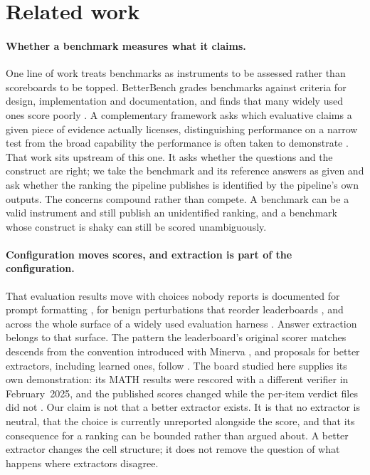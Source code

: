 
\section{Related work}
\label{sec:related}

\paragraph{Whether a benchmark measures what it claims.}
One line of work treats benchmarks as instruments to be assessed rather than scoreboards to be
topped. BetterBench grades benchmarks against criteria for design, implementation and
documentation, and finds that many widely used ones score poorly \citep{reuel2024betterbench}.
A complementary framework asks which evaluative claims a given piece of evidence actually
licenses, distinguishing performance on a narrow test from the broad capability the
performance is often taken to demonstrate \citep{salaudeen2025measurement}. That work sits
upstream of this one. It asks whether the questions and the construct are right; we take the
benchmark and its reference answers as given and ask whether the ranking the pipeline
publishes is identified by the pipeline's own outputs. The concerns compound rather than
compete. A benchmark can be a valid instrument and still publish an unidentified ranking, and
a benchmark whose construct is shaky can still be scored unambiguously.

\paragraph{Configuration moves scores, and extraction is part of the configuration.}
That evaluation results move with choices nobody reports is documented for prompt formatting
\citep{sclar2023quantifying}, for benign perturbations that reorder leaderboards
\citep{alzahrani2024benchmarks}, and across the whole surface of a widely used evaluation
harness \citep{biderman2024lessons}. Answer extraction belongs to that surface. The pattern
the leaderboard's original scorer matches descends from the convention introduced with Minerva
\citep{lewkowycz2022minerva}, and proposals for better extractors, including learned ones,
follow \citep{yu2024xfinder}. The board studied here supplies its own demonstration: its MATH
results were rescored with a different verifier in February~2025, and the published scores
changed while the per-item verdict files did not \citep{kydlicek2025fixing}. Our claim is not
that a better extractor exists. It is that no extractor is neutral, that the choice is
currently unreported alongside the score, and that its consequence for a ranking can be
bounded rather than argued about. A better extractor changes the cell structure; it does not
remove the question of what happens where extractors disagree.

